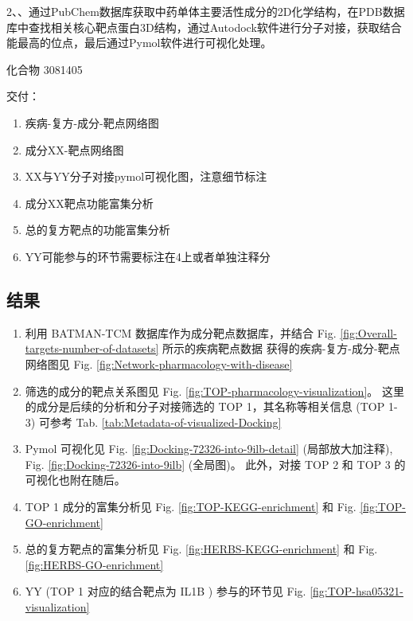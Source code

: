 \documentclass[
]{article}
\providecommand{\tightlist}{%
  \setlength{\itemsep}{0pt}\setlength{\parskip}{0pt}}
\begin{document}
2、、通过PubChem数据库获取中药单体主要活性成分的2D化学结构，在PDB数据库中查找相关核心靶点蛋白3D结构，通过Autodock软件进行分子对接，获取结合能最高的位点，最后通过Pymol软件进行可视化处理。

化合物 3081405

交付：

\begin{enumerate}
\def\labelenumi{\arabic{enumi}.}
\tightlist
\item
  疾病-复方-成分-靶点网络图
\item
  成分XX-靶点网络图
\item
  XX与YY分子对接pymol可视化图，注意细节标注
\item
  成分XX靶点功能富集分析
\item
  总的复方靶点的功能富集分析
\item
  YY可能参与的环节需要标注在4上或者单独注释分
\end{enumerate}

\hypertarget{ux7ed3ux679c}{%
\subsection{结果}\label{ux7ed3ux679c}}

\begin{enumerate}
\def\labelenumi{\arabic{enumi}.}
\tightlist
\item
  利用 BATMAN-TCM 数据库作为成分靶点数据库，并结合 Fig. \ref{fig:Overall-targets-number-of-datasets} 所示的疾病靶点数据
  获得的疾病-复方-成分-靶点网络图见 Fig. \ref{fig:Network-pharmacology-with-disease}
\item
  筛选的成分的靶点关系图见 Fig. \ref{fig:TOP-pharmacology-visualization}。
  这里的成分是后续的分析和分子对接筛选的 TOP 1，其名称等相关信息 (TOP 1-3) 可参考 Tab. \ref{tab:Metadata-of-visualized-Docking}
\item
  Pymol 可视化见 Fig. \ref{fig:Docking-72326-into-9ilb-detail} (局部放大加注释),
  Fig. \ref{fig:Docking-72326-into-9ilb} (全局图)。
  此外，对接 TOP 2 和 TOP 3 的可视化也附在随后。
\item
  TOP 1 成分的富集分析见 Fig. \ref{fig:TOP-KEGG-enrichment} 和 Fig. \ref{fig:TOP-GO-enrichment}
\item
  总的复方靶点的富集分析见 Fig. \ref{fig:HERBS-KEGG-enrichment} 和 Fig. \ref{fig:HERBS-GO-enrichment}
\item
  YY (TOP 1 对应的结合靶点为 IL1B ) 参与的环节见
  Fig. \ref{fig:TOP-hsa05321-visualization}
\end{enumerate}
\end{document}

